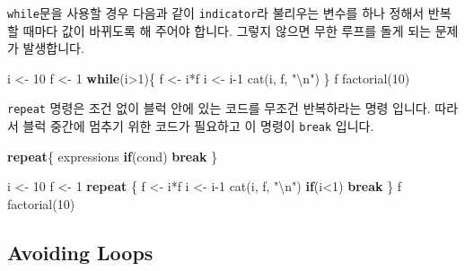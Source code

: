 \documentclass[
]{book}
\newenvironment{Shaded}{\begin{snugshade}}{\end{snugshade}}
\newcommand{\ControlFlowTok}[1]{\textcolor[rgb]{0.13,0.29,0.53}{\textbf{#1}}}
\newcommand{\DecValTok}[1]{\textcolor[rgb]{0.00,0.00,0.81}{#1}}
\newcommand{\FunctionTok}[1]{\textcolor[rgb]{0.00,0.00,0.00}{#1}}
\newcommand{\NormalTok}[1]{#1}
\newcommand{\OtherTok}[1]{\textcolor[rgb]{0.56,0.35,0.01}{#1}}
\newcommand{\SpecialCharTok}[1]{\textcolor[rgb]{0.00,0.00,0.00}{#1}}
\newcommand{\StringTok}[1]{\textcolor[rgb]{0.31,0.60,0.02}{#1}}
\begin{document}
\texttt{while}문을 사용할 경우 다음과 같이 \texttt{indicator}라 불리우는 변수를 하나 정해서 반복 할 때마다 값이 바뀌도록 해 주어야 합니다. 그렇지 않으면 무한 루프를 돌게 되는 문제가 발생합니다.

\begin{Shaded}
\begin{Highlighting}[]
\NormalTok{i }\OtherTok{\textless{}{-}} \DecValTok{10}
\NormalTok{f }\OtherTok{\textless{}{-}} \DecValTok{1}
\ControlFlowTok{while}\NormalTok{(i}\SpecialCharTok{\textgreater{}}\DecValTok{1}\NormalTok{)\{}
\NormalTok{  f }\OtherTok{\textless{}{-}}\NormalTok{ i}\SpecialCharTok{*}\NormalTok{f}
\NormalTok{  i }\OtherTok{\textless{}{-}}\NormalTok{ i}\DecValTok{{-}1}
  \FunctionTok{cat}\NormalTok{(i, f, }\StringTok{"}\SpecialCharTok{\textbackslash{}n}\StringTok{"}\NormalTok{)}
\NormalTok{\}}
\NormalTok{f}
\FunctionTok{factorial}\NormalTok{(}\DecValTok{10}\NormalTok{)}
\end{Highlighting}
\end{Shaded}

\texttt{repeat} 명령은 조건 없이 블럭 안에 있는 코드를 무조건 반복하라는 명령 입니다. 따라서 블럭 중간에 멈추기 위한 코드가 필요하고 이 명령이 \texttt{break} 입니다.

\begin{Shaded}
\begin{Highlighting}[]
\ControlFlowTok{repeat}\NormalTok{\{}
\NormalTok{  expressions}
  \ControlFlowTok{if}\NormalTok{(cond) }\ControlFlowTok{break}
\NormalTok{\}}

\NormalTok{i }\OtherTok{\textless{}{-}} \DecValTok{10}
\NormalTok{f }\OtherTok{\textless{}{-}} \DecValTok{1}
\ControlFlowTok{repeat}\NormalTok{ \{}
\NormalTok{  f }\OtherTok{\textless{}{-}}\NormalTok{ i}\SpecialCharTok{*}\NormalTok{f}
\NormalTok{  i }\OtherTok{\textless{}{-}}\NormalTok{ i}\DecValTok{{-}1}
  \FunctionTok{cat}\NormalTok{(i, f, }\StringTok{"}\SpecialCharTok{\textbackslash{}n}\StringTok{"}\NormalTok{)}
  \ControlFlowTok{if}\NormalTok{(i}\SpecialCharTok{\textless{}}\DecValTok{1}\NormalTok{) }\ControlFlowTok{break}
\NormalTok{\}}
\NormalTok{f}
\FunctionTok{factorial}\NormalTok{(}\DecValTok{10}\NormalTok{)}
\end{Highlighting}
\end{Shaded}

\hypertarget{avoiding-loops}{%
\subsection{Avoiding Loops}\label{avoiding-loops}}
\end{document}
